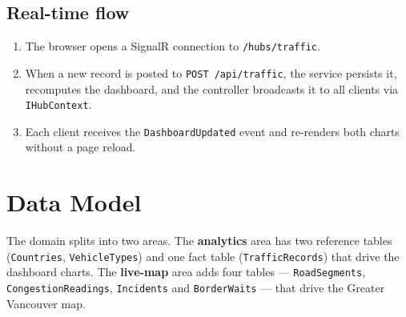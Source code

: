 \documentclass[11pt,a4paper]{article}
\newcommand{\code}[1]{\texttt{\small #1}}
\begin{document}
\subsection{Real-time flow}
\begin{enumerate}[noitemsep]
  \item The browser opens a SignalR connection to \code{/hubs/traffic}.
  \item When a new record is posted to \code{POST /api/traffic}, the service
        persists it, recomputes the dashboard, and the controller broadcasts it
        to all clients via \code{IHubContext}.
  \item Each client receives the \code{DashboardUpdated} event and re-renders
        both charts without a page reload.
\end{enumerate}

\section{Data Model}
The domain splits into two areas. The \textbf{analytics} area has two reference
tables (\code{Countries}, \code{VehicleTypes}) and one fact table
(\code{TrafficRecords}) that drive the dashboard charts. The \textbf{live-map}
area adds four tables --- \code{RoadSegments}, \code{CongestionReadings},
\code{Incidents} and \code{BorderWaits} --- that drive the Greater Vancouver map.

\begin{center}
\end{center}
\end{document}

